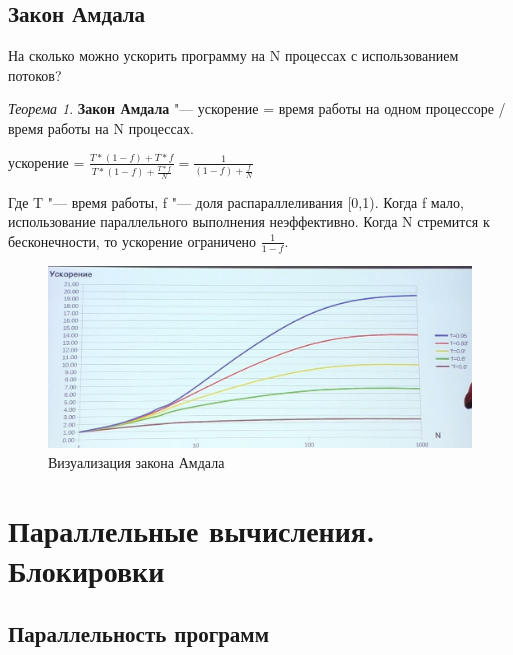 \documentclass[bachelor, och, book]{SCWorks}
\theoremstyle{remark}
\newtheorem{theorem}{Теорема}
\begin{document}
    \subsection{Закон Амдала}

    На сколько можно ускорить программу на N процессах с использованием потоков?

    \begin{theorem}
        \textbf{Закон Амдала} "--- ускорение = время работы на одном процессоре / время работы на N процессах.
    \end{theorem}

    \huge
    ускорение =  $\frac{T * (1 - f) + T * f}{T * (1 - f) + \frac{T * f}{N}} = \frac{1}{(1-f) + \frac{f}{N}}$
    \normalsize

    \hfill \break
    Где T "--- время работы, f "--- доля распараллеливания [0,1). Когда f мало, использование параллельного выполнения неэффективно. Когда N стремится к бесконечности, то ускорение ограничено $\frac{1}{1 - f}$.

    \begin{figure}[H]
        \begin{center}
            \includegraphics[scale=0.40]{res/Amdahl's-law.png}
            \caption{Визуализация закона Амдала}
        \end{center}
    \end{figure}

    \section{Параллельные вычисления. Блокировки}

    \subsection{Параллельность программ}
    
\end{document}
